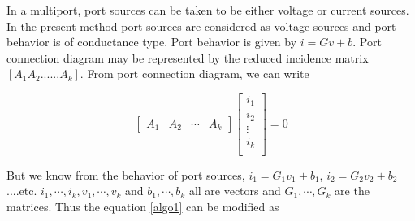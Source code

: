 \documentclass[10pt,psfig,letterpaper,twocolumn]{article}
\begin{document}
In a multiport, port sources can be taken to be either voltage or current sources. In the present method port sources are
considered as voltage sources and port behavior is of conductance type. Port behavior is given by
$i=Gv+b$. Port connection diagram may be represented by the reduced incidence matrix 
$[A_{1} A_{2} ...... A_{k}]$. From port connection diagram, we can write

\begin{equation}
\left[\begin{array}{llll}
A_{1} & A_{2} & {\cdots} & A_{k}
\end{array}\right]
\left[\begin{array}{l}
i_{1}\\
i_{2}\\ 
{\vdots}\\
i_{k}\\
\end{array}\right]
= 0
\label{algo1}
\end{equation}

But we know from the behavior of port sources, $i_{1} = G_{1}v_{1} + b_{1}$, $i_{2} = G_{2}v_{2} +
b_{2}$ ....etc. $ i_{1},\cdots ,i_{k}  ,  v_{1},\cdots ,v_{k} $ and $ b_{1},\cdots ,b_{k} $ all are 
vectors and  $ G_{1}, \cdots ,G_{k} $ are the matrices. Thus the equation \ref{algo1} can be modified as
\end{document}

